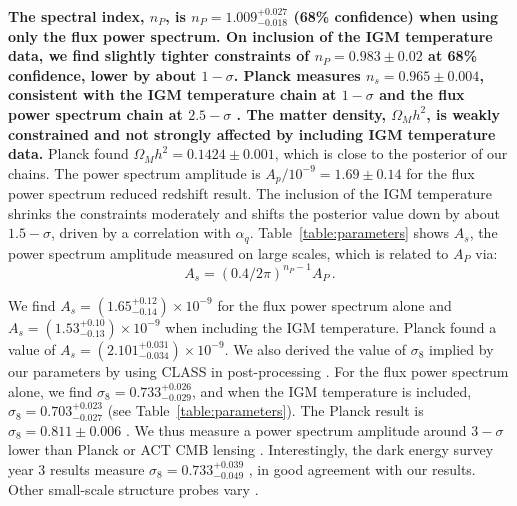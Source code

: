 \textbf{The spectral index, $n_P$, is $n_P = 1.009^{+0.027}_{-0.018}$ (68\% confidence) when using only the flux power spectrum. On inclusion of the IGM temperature data, we find slightly tighter constraints of $n_P = 0.983 \pm 0.02$ at 68\% confidence, lower by about $1-\sigma$.
Planck measures $n_s=0.965 \pm 0.004$, consistent with the IGM temperature chain at $1-\sigma$ and the flux power spectrum chain at $2.5-\sigma$ \cite{2020A&A...641A...6P}.
The matter density, $\Omega_M h^2$, is weakly constrained and not strongly affected by including IGM temperature data.}
Planck found $\Omega_M h^2 = 0.1424\pm0.001$, which is close to the posterior of our chains.
The power spectrum amplitude is $A_p/10^{-9} = 1.69 \pm 0.14$ for the flux power spectrum reduced redshift result.
The inclusion of the IGM temperature shrinks the constraints moderately and shifts the posterior value down by about $1.5-\sigma$, driven by a correlation with $\alpha_q$.
Table~\ref{table:parameters} shows $A_s$, the power spectrum amplitude measured on large scales, which is related to $A_P$ via:
\begin{equation}
    A_s = \left(0.4/2\pi\right)^{n_P-1} A_P\,.
\end{equation}

We find $A_s = (1.65^{+0.12}_{-0.14}) \times10^{-9}$ for the flux power spectrum alone and $A_s = (1.53^{+0.10}_{-0.13})\times10^{-9}$ when including the IGM temperature.
Planck \cite{2020A&A...641A...6P} found a value of $A_s = \left(2.101^{+0.031}_{-0.034}\right)\times10^{-9}$. 
We also derived the value of $\sigma_8$ implied by our parameters by using CLASS in post-processing \cite{2011arXiv1104.2932L}. 
For the flux power spectrum alone, we find $\sigma_8 = 0.733^{+0.026}_{-0.029}$, and when the IGM temperature is included, $\sigma_8 = 0.703^{+0.023}_{-0.027}$ (see Table~\ref{table:parameters}).
The Planck result is $\sigma_8 = 0.811 \pm 0.006$ \cite{2020A&A...641A...6P}.
We thus measure a power spectrum amplitude around $3-\sigma$ lower than Planck or ACT CMB lensing \cite{2023arXiv230405202Q}.
Interestingly, the dark energy survey year 3 results measure $\sigma_8 = 0.733^{+0.039}_{-0.049}$ \cite{2022PhRvD.105b3520A}, in good agreement with our results. Other small-scale structure probes vary \cite[e.g.~][]{2020JCAP...05..042I, 2022JHEAp..34...49A, 2023JCAP...04..057Y}. 

